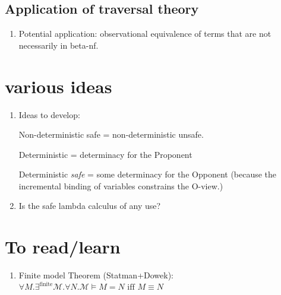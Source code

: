 \documentclass{article}
\begin{document}
\subsection{Application of traversal theory}
\begin{enumerate}
  \item Potential application: observational equivalence of terms that are not necessarily in beta-nf.
\end{enumerate}

\section{various ideas}
\begin{enumerate}
\item Ideas to develop:

Non-deterministic safe = non-deterministic unsafe.

Deterministic = determinacy for the Proponent

Deterministic \emph{safe} = some determinacy for the Opponent (because the incremental binding of variables constrains the O-view.)

\item Is the safe lambda calculus of any use?
\end{enumerate}



\section{To read/learn}
\begin{enumerate}
\item Finite model Theorem (Statman+Dowek): $\forall M. \exists^{\mbox{finite}} \mathcal{M}. \forall N. \mathcal{M} \models M=N \mbox{ iff } M \equiv N$
\end{enumerate}
\end{document}
